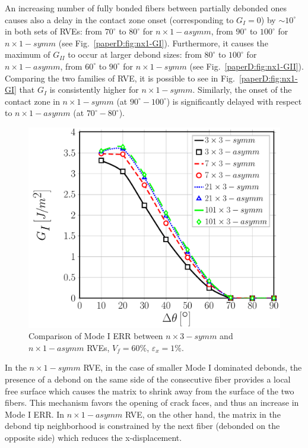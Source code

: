 An increasing number of fully bonded fibers between partially debonded ones causes also a delay in the contact zone onset (corresponding to $G_{I}=0$) by $\sim10^{\circ}$  in both sets of RVEs: from $70^{\circ}$ to $80^{\circ}$ for $n \times 1-asymm$, from $90^{\circ}$ to $100^{\circ}$ for $n \times 1-symm$ (see Fig.~\ref{paperD:fig:nx1-GI}). Furthermore, it causes the maximum of $G_{II}$ to occur at larger debond sizes: from $80^{\circ}$ to $100^{\circ}$ for $n \times 1-asymm$, from $60^{\circ}$ to $90^{\circ}$ for $n \times 1-symm$ (see Fig.~\ref{paperD:fig:nx1-GII}).\\
Comparing the two families of RVE, it is possible to see in Fig.~\ref{paperD:fig:nx1-GI} that $G_{I}$ is consistently higher for $n \times 1-symm$. Similarly, the onset of the contact zone in $n \times 1-symm$ (at $90^{\circ}-100^{\circ}$) is significantly delayed with respect to $n \times 1 - asymm$ (at $70^{\circ}- 80^{\circ}$).

\begin{figure}[!htb]
\centering
  \includegraphics[width=\textwidth]{paperD/nxk-coupling-vf60-GI.pdf}
\caption{Comparison of Mode I ERR between $n \times 3-symm$ and $n \times 1-asymm$ RVEs, $V_{f}=60\%$, $\varepsilon_{x}=1\%$.}\label{paperD:fig:nxk-GI}
\end{figure}

In the $n \times 1-symm$ RVE, in the case of smaller Mode I dominated debonds, the presence of a debond on the same side of the consecutive fiber provides a local free surface which causes the matrix to shrink away from the surface of the two fibers.  This mechanism favors the opening of crack faces, and thus an increase in Mode I ERR. In $n \times 1-asymm$ RVE, on the other hand, the matrix in the debond tip neighborhood is constrained by the next fiber (debonded on the opposite side) which reduces the x-displacement.

